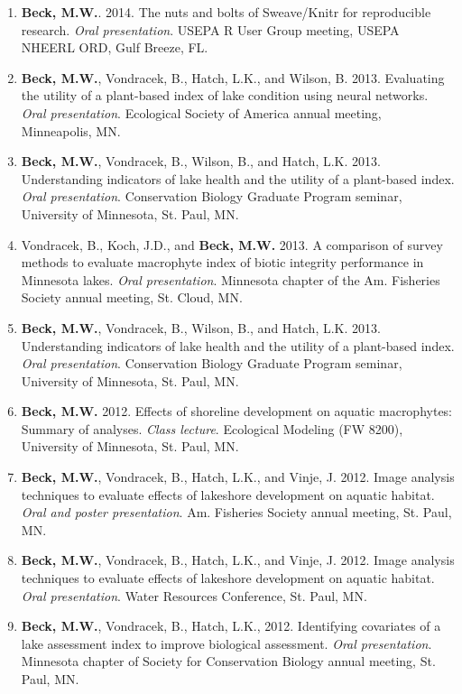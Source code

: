 \documentclass[letterpaper,12pt]{article}
\begin{document}
\begin{enumerate}
\item {\bf Beck, M.W.}. 2014. The nuts and bolts of Sweave/Knitr for reproducible research. \textit{Oral presentation}. USEPA R User Group meeting, USEPA NHEERL ORD, Gulf Breeze, FL.

\item {\bf Beck, M.W.}, Vondracek, B., Hatch, L.K., and Wilson, B. 2013. Evaluating the utility of a plant-based index of lake condition using neural networks. \textit{Oral presentation}. Ecological Society of America annual meeting, Minneapolis, MN.

\item {\bf Beck, M.W.}, Vondracek, B., Wilson, B., and Hatch, L.K. 2013. Understanding indicators of lake health and the utility of a plant-based index. \textit{Oral presentation}. Conservation Biology Graduate Program seminar, University of Minnesota, St. Paul, MN.

\item Vondracek, B., Koch, J.D., and {\bf Beck, M.W.} 2013. A comparison of survey methods to evaluate macrophyte index of biotic integrity performance in Minnesota lakes. \textit{Oral presentation}. Minnesota chapter of the Am. Fisheries Society annual meeting, St. Cloud, MN.

\item {\bf Beck, M.W.}, Vondracek, B., Wilson, B., and Hatch, L.K. 2013. Understanding indicators of lake health and the utility of a plant-based index. \textit{Oral presentation}. Conservation Biology Graduate Program seminar, University of Minnesota, St. Paul, MN.

\item {\bf Beck, M.W.} 2012. Effects of shoreline development on aquatic macrophytes: Summary of analyses. \textit{Class lecture}. Ecological Modeling (FW 8200), University of Minnesota, St. Paul, MN.

\item {\bf Beck, M.W.}, Vondracek, B., Hatch, L.K., and Vinje, J. 2012. Image analysis techniques to evaluate effects of lakeshore development on aquatic habitat. \textit{Oral and poster presentation}. Am. Fisheries Society annual meeting, St. Paul, MN.

\item {\bf Beck, M.W.}, Vondracek, B., Hatch, L.K., and Vinje, J. 2012. Image analysis techniques to evaluate effects of lakeshore development on aquatic habitat. \textit{Oral presentation}. Water Resources Conference, St. Paul, MN.

\item {\bf Beck, M.W.}, Vondracek, B., Hatch, L.K., 2012. Identifying covariates of a lake assessment index to improve biological assessment. \textit{Oral presentation}. Minnesota chapter of Society for Conservation Biology annual meeting, St. Paul, MN.


\end{enumerate}
\end{document}

